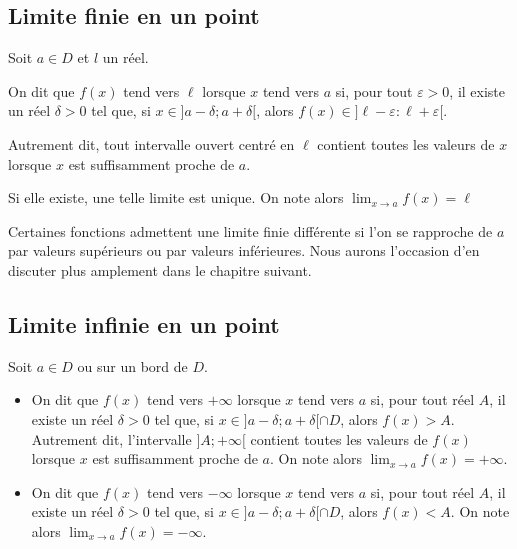\documentclass[11pt,fleqn, openany]{book} %
\begin{document}
\subsection{Limite finie en un point}

\begin{definition}Soit $a \in D$ et $l$ un réel.

On dit que $f(x)$ tend vers $\ell$ lorsque $x$ tend vers $a$  si, pour tout $\varepsilon>0$, il existe un réel $\delta >0$ tel que, si $x\in ]a - \delta ; a+\delta[$, alors $f(x) \in ]\ell-\varepsilon : \ell+ \varepsilon [$.

Autrement dit, tout intervalle ouvert centré en $\ell$ contient toutes les valeurs de $x$ lorsque $x$ est suffisamment proche de $a$.

Si elle existe, une telle limite est unique. On note alors $\displaystyle \lim_{x \to a} f(x) =\ell $\end{definition}

Certaines fonctions admettent une limite finie différente si l'on se rapproche de $a$ par valeurs supérieurs ou par valeurs inférieures. Nous aurons l'occasion d'en discuter plus amplement dans le chapitre suivant.

\subsection{Limite infinie en un point}

\begin{definition}Soit $a \in D$ ou sur un bord de $D$.
\begin{itemize}
\item On dit que $f(x)$ tend vers $+\infty$ lorsque $x$ tend vers $a$  si, pour tout réel $A$, il existe un réel $\delta >0$ tel que, si $x\in ]a - \delta ; a+\delta[\cap D$, alors $f(x) > A$. Autrement dit, l'intervalle $]A;+\infty[$ contient toutes les valeurs de $f(x)$ lorsque $x$ est suffisamment proche de $a$. On note alors $\displaystyle \lim_{x \to a} f(x) =+\infty $.
\item On dit que $f(x)$ tend vers $-\infty$ lorsque $x$ tend vers $a$  si, pour tout réel $A$, il existe un réel $\delta >0$ tel que, si $x\in ]a - \delta ; a+\delta[\cap D$, alors $f(x) < A$. On note alors $\displaystyle \lim_{x \to a} f(x) =-\infty $.
\end{itemize}
\end{definition}
\end{document}

